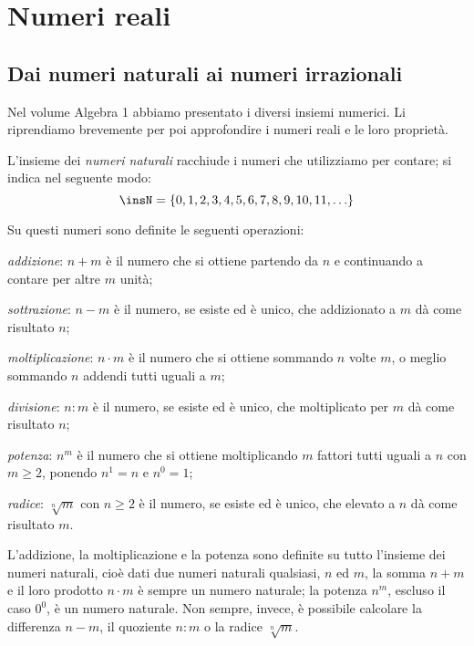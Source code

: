 \chapter{Numeri reali}
\section{Dai numeri naturali ai numeri irrazionali}
Nel volume Algebra 1 abbiamo presentato i diversi insiemi numerici. Li riprendiamo brevemente per poi approfondire i numeri reali e le loro proprietà.

L'insieme dei \emph{numeri naturali} racchiude i numeri che utilizziamo per contare; si indica nel seguente modo:
\[\insN=\{0,1,2,3,4,5,6,7,8,9,10,11,\ldots\}\]

Su questi numeri sono definite le seguenti operazioni:
\begin{itemize*}
 \item \emph{addizione}: $n+m$ è il numero che si ottiene partendo da $n$ e continuando a contare per altre $m$ unità;
 \item \emph{sottrazione}: $n-m$ è il numero, se esiste ed è unico, che addizionato a $m$ dà come risultato $n$;
 \item \emph{moltiplicazione}: $n \cdot m$ è il numero che si ottiene sommando $n$ volte $m$, o meglio sommando $n$ addendi tutti uguali a $m$;
 \item \emph{divisione}: $n:m$ è il numero, se esiste ed è unico, che moltiplicato per $m$ dà come risultato $n$;
 \item \emph{potenza}: $n^{m}$ è il numero che si ottiene moltiplicando $m$ fattori tutti uguali a $n$ con $m \ge 2$, ponendo $n^{1}=n$ e $n^{0}=1$;
 \item \emph{radice}: $\sqrt[{n}]{m}$ con $n\ge 2$ è il numero, se esiste ed è unico, che elevato a $n$ dà come risultato $m$.
\end{itemize*}

L'addizione, la moltiplicazione e la potenza sono definite su tutto l'insieme dei numeri naturali, cioè dati due numeri naturali qualsiasi, $n$ ed $m$, la somma $n+m$ e il loro prodotto $n \cdot m$ è sempre un numero naturale; la potenza $n^{m}$, escluso il caso $0^{0}$, è un numero naturale. Non sempre, invece, è possibile calcolare la differenza $n-m$, il quoziente $n:m$ o la radice $\sqrt[{n}]{m}$.

